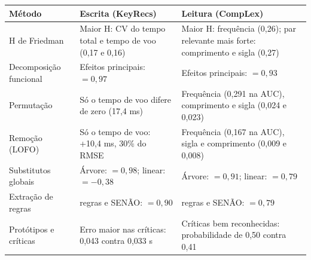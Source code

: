 \begin{tabular}{@{}>{\raggedright\arraybackslash}p{3.1cm}
                >{\raggedright\arraybackslash}p{5.9cm}
                >{\raggedright\arraybackslash}p{5.9cm}@{}}
\toprule
Método & Escrita (KeyRecs) & Leitura (CompLex) \\
\midrule
H de Friedman & Maior H: CV do tempo total e tempo de voo (0,17 e 0,16) & Maior H: frequência (0,26); par relevante mais forte: comprimento e sigla (0,27) \\
Decomposição funcional & Efeitos principais: \Rdois{} $= 0,97$ & Efeitos principais: \Rdois{} $= 0,93$ \\
Permutação & Só o tempo de voo difere de zero (17,4 ms) & Frequência (0,291 na AUC), comprimento e sigla (0,024 e 0,023) \\
Remoção (LOFO) & Só o tempo de voo: +10,4 ms, 30\% do RMSE & Frequência (0,167 na AUC), sigla e comprimento (0,009 e 0,008) \\
Substitutos globais & Árvore: \Rdois{} $= 0,98$; linear: \Rdois{} $= -0,38$ & Árvore: \Rdois{} $= 0,91$; linear: \Rdois{} $= 0,79$ \\
Extração de regras & 5 regras e SENÃO: \Rdois{} $= 0,90$ & 5 regras e SENÃO: \Rdois{} $= 0,79$ \\
Protótipos e críticas & Erro maior nas críticas: 0,043 contra 0,033 s & Críticas bem reconhecidas: probabilidade de 0,50 contra 0,41 \\
\bottomrule
\end{tabular}
